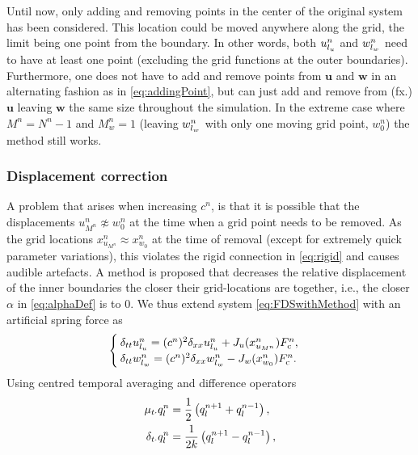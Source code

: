 Until now, only adding and removing points in the center of the original system has been considered. This location could be moved anywhere along the grid, the limit being one point from the boundary. In other words, both $u_{l_u}^n$ and $w_{l_w}^n$ need to have at least one point (excluding the grid functions at the outer boundaries). Furthermore, one does not have to add and remove points from $\mathbf{u}$ and $\mathbf{w}$ in an alternating fashion as in \eqref{eq:addingPoint}, but can just add and remove from (fx.) $\mathbf{u}$ leaving $\mathbf{w}$ the same size throughout the simulation. In the extreme case where $M^n = N^n - 1$ and $M_w^n = 1$ (leaving $w_{l_w}^n$ with only one moving grid point, $w_0^n$) the method still works.

\subsubsection{Displacement correction}\label{sec:dispCorr}
A problem that arises when increasing $c^n$, is that it is possible that the displacements $u_{M^n}^n \not\approx w_0^n$ at the time when a grid point needs to be removed. As the grid locations $x_{u_{M^n}}^n \approx x_{w_0}^n$ at the time of removal (except for extremely quick parameter variations), this violates the rigid connection in \eqref{eq:rigid} and causes audible artefacts. A method is proposed that decreases the relative displacement of the inner boundaries the closer their grid-locations are together, i.e., the closer $\alpha$ in \eqref{eq:alphaDef} is to 0. We thus extend system \eqref{eq:FDSwithMethod} with an artificial spring force as
\begin{equation}\label{eq:sysDispCorr}
\begin{cases}
    \delta_{tt}u_\lu^n = (c^n)^2\delta_{xx}u_\lu^n+ J_u(x_{u_{M^n}}^n)%
    F_\text{c}^n,\\
    \delta_{tt}w_\lw^n = (c^n)^2\delta_{xx}w_\lw^n - J_w(x_{w_0}^n)%
    F_\text{c}^n.
\end{cases}
\end{equation}
Using centred temporal averaging and difference operators
\begin{subequations}\label{eq:centredOperators}
\begin{align}\label{eq:centredAverage}
    \mu_{t\cdot}q_l^n &= \frac{1}{2} \left(q_l^{n+1} + q_l^{n-1}\right),\\
    \delta_{t\cdot}q_l^n &= \frac{1}{2k} \left(q_l^{n+1} - q_l^{n-1}\right),
\end{align}
\end{subequations}
